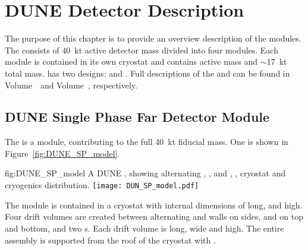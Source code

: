 \chapter{DUNE Detector Description}
\label{vl:tc-dune_overview}


The purpose of this chapter is to provide an overview description of the    modules. The  consists of \SI{40}{\kilo\tonne} active
detector mass divided into four modules. Each module is contained in
its own cryostat and contains \nominalmodsize active mass and
$\sim$\SI{17}{\kilo\tonne} total mass.  has two designs:
 and . %
Full
descriptions of the  and   can be found
in   Volume~\volnumbersp\ and  Volume~\volnumberdp{}, respectively.

\section{DUNE Single Phase Far Detector Module}
\label{sec:fdsp-SP-module}

The   is a \nominalmodsize module,
contributing to the full \SI{40}{\kilo\tonne}  fiducial
mass.  One \nominalmodsize {} is shown in
Figure~\ref{fig:DUNE_SP_model}.
\begin{dunefigure}
{fig:DUNE_SP_model} 
{A \nominalmodsize DUNE 
    , showing alternating ,
    ,  and , , cryostat
    and cryogenics distribution.}
  \texttt{[image: DUN\_SP\_model.pdf]}
\end{dunefigure} 

The module is contained in a cryostat with
internal dimensions of \cryostatlen %
long, \cryostatwdth %
and \cryostatht %
high.  Four drift volumes are created between
alternating  and  walls on sides,  and
 on top and bottom, and two \endwall{}s.  Each drift volume
is \sptpclen %
long, \spmaxdrift %
wide and
\tpcheight %
high.  The entire assembly is supported from the
roof of the cryostat with .

